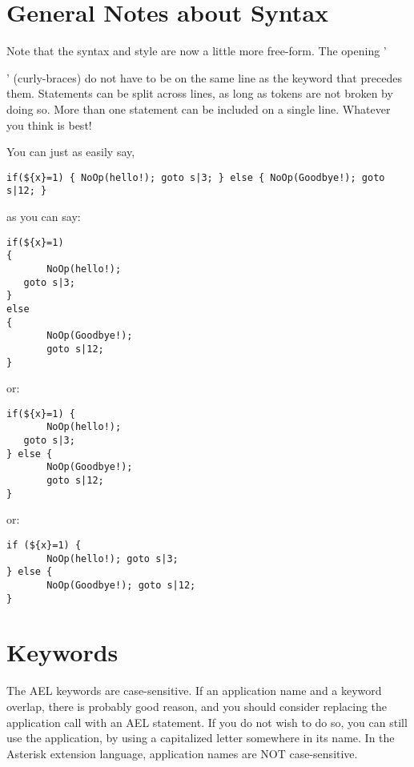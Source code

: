 \section{General Notes about Syntax}

Note that the syntax and style are now a little more free-form. The
opening '{' (curly-braces) do not have to be on the same line as the
keyword that precedes them. Statements can be split across lines, as
long as tokens are not broken by doing so. More than one statement can
be included on a single line. Whatever you think is best!

You can just as easily say,

\begin{verbatim}
if(${x}=1) { NoOp(hello!); goto s|3; } else { NoOp(Goodbye!); goto s|12; }
\end{verbatim}

as you can say:

\begin{verbatim}
if(${x}=1)
{
       NoOp(hello!);
   goto s|3;
}
else
{
       NoOp(Goodbye!);
       goto s|12;
}
\end{verbatim}

or:

\begin{verbatim}
if(${x}=1) {
       NoOp(hello!);
   goto s|3;
} else {
       NoOp(Goodbye!);
       goto s|12;
}
\end{verbatim}

or:

\begin{verbatim}
if (${x}=1) {
       NoOp(hello!); goto s|3;
} else {
       NoOp(Goodbye!); goto s|12;
}
\end{verbatim}

\section{Keywords}

The AEL keywords are case-sensitive. If an application name and a
keyword overlap, there is probably good reason, and you should
consider replacing the application call with an AEL statement. If you
do not wish to do so, you can still use the application, by using a
capitalized letter somewhere in its name. In the Asterisk extension
language, application names are NOT case-sensitive.

}
